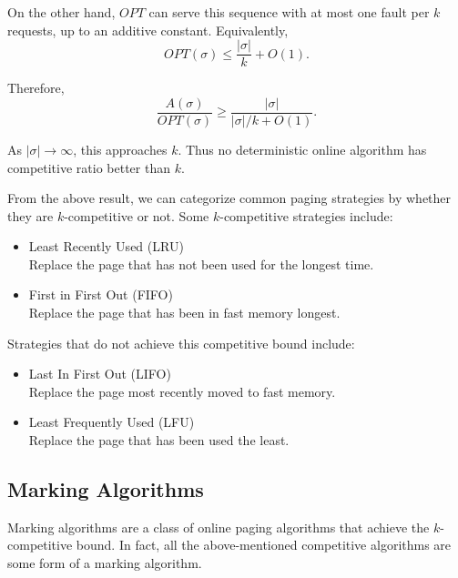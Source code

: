 \documentclass[14pt]{extreport}
\begin{document}
    \vspace{2mm}
    On the other hand, $OPT$ can serve this sequence with at most one fault per $k$ requests, up to an additive constant. Equivalently,
    $$OPT(\sigma) \le \frac{|\sigma|}{k} + O(1).$$

    \vspace{2mm}
    Therefore,
    $$\frac{A(\sigma)}{OPT(\sigma)}
    \ge
    \frac{|\sigma|}{|\sigma|/k + O(1)}.$$

    \vspace{2mm}
    As $|\sigma| \to \infty$, this approaches $k$. Thus no deterministic online algorithm has competitive ratio better than $k$.

    \vspace{5mm}
    From the above result, we can categorize common paging strategies by whether they are $k$-competitive or not. Some $k$-competitive strategies include:
    \begin{itemize}[label={}]
        \item Least Recently Used (LRU) \\
        Replace the page that has not been used for the longest time.
        \item First in First Out (FIFO) \\
        Replace the page that has been in fast memory longest.
    \end{itemize}
    Strategies that do not achieve this competitive bound include:
    \begin{itemize}[label={}]
        \item Last In First Out (LIFO) \\
        Replace the page most recently moved to fast memory.
        \item Least Frequently Used (LFU) \\
        Replace the page that has been used the least.
    \end{itemize}


\subsection*{Marking Algorithms}
    Marking algorithms are a class of online paging algorithms that achieve the $k$-competitive bound. In fact, all the above-mentioned competitive algorithms are some form of a marking algorithm.
    
\end{document}
